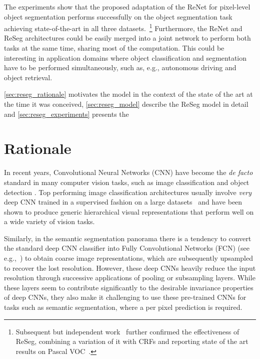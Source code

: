 The experiments show that the proposed adaptation of the ReNet for pixel-level
object segmentation performs successfully on the object segmentation task
achieving state-of-the-art in all three datasets.~\footnote{
    Subsequent but independent work~\cite{DBLP:journals/corr/YanZJBY16} further
    confirmed the effectiveness of ReSeg, combining a variation of it with CRFs
    and reporting state of the art results on Pascal VOC~\cite{Everingham15}.}
Furthermore, the ReNet and ReSeg architectures could be easily merged into a
joint network to perform both tasks at the same time, sharing most of the
computation. This could be interesting in application domains where object
classification and segmentation have to be performed simultaneously, such as,
e.g., autonomous driving and object retrieval.

\autoref{sec:reseg_rationale} motivates the model in the context
of the state of the art at the time it was conceived, \autoref{sec:reseg_model}
describe the ReSeg model in detail and \autoref{sec:reseg_experiments} presents
the



\section{Rationale}\label{sec:reseg_rationale}

In recent years, Convolutional Neural Networks (CNN) have become the {\em de
facto} standard in many computer vision tasks, such as image classification and
object detection \cite{Krizhevsky-2012,Erhan2014}. Top performing image
classification architectures usually involve {\em very} deep CNN trained in a
supervised fashion on a large datasets~\cite{Lin2014,Simonyan2015,
szegedy2014going} and have been shown to produce generic hierarchical visual
representations that perform well on a wide variety of vision tasks.

Similarly, in the semantic segmentation panorama there is a tendency to convert
the standard deep CNN classifier into Fully Convolutional Networks (FCN) (see
e.g.,~\cite{long2014fully,noh2015learning, badrinarayanan2015segnet,
Ronneberger2015}) to obtain coarse image representations, which are
subsequently upsampled to recover the lost resolution. However, these deep CNNs
heavily reduce the input resolution through successive applications of pooling
or subsampling layers. While these layers seem to contribute significantly to
the desirable invariance properties of deep CNNs, they also make it challenging
to use these pre-trained CNNs for tasks such as semantic segmentation, where a
per pixel prediction is required.

